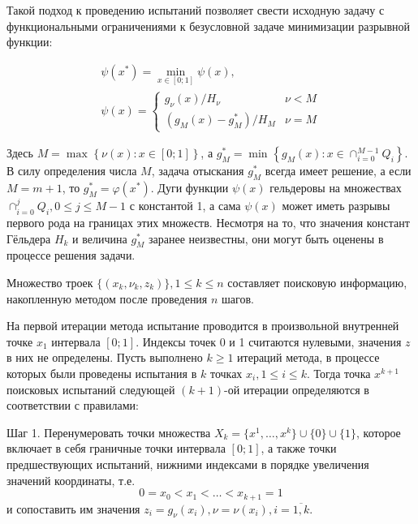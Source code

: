 \documentclass[11pt, oneside, a4paper]{article}
\begin{document}
Такой подход к проведению испытаний позволяет свести исходную задачу с функциональными
ограничениями к безусловной задаче минимизации разрывной функции:

\begin{displaymath}
  \begin{array}{lr}
    \psi (x^{*})=\min_{x\in [0;1]}\psi (x), \\
    \psi (x)={\begin{cases}g_{\nu }(x)/H_{\nu }&\nu <M\\(g_{M}(x)-g_{M}^{*})/H_{M}&\nu =M\end{cases}}
  \end{array}
\end{displaymath}

Здесь \(M=\max_{}^{}\left\{\nu (x):x\in [0;1]\right\}\), а \(g_{M}^{*}=\min _{}^{}\left\{g_{M}(x):x\in \cap _{i=0}^{M-1}Q_{i}\right\}\).
В силу определения числа \(M\), задача отыскания \(g_{M}^{*}\)
всегда имеет решение, а если \(M=m+1\), то \(g_{M}^{*}=\varphi(x^{*})\).
Дуги функции \(\psi (x)\) гельдеровы на множествах \(\cap _{i=0}^{j}Q_{i},0\leq j\leq M-1\)
с константой 1, а сама \(\psi (x)\) может иметь разрывы первого рода на границах этих множеств.
Несмотря на то, что значения констант Гёльдера \(H_k\) и величина \(g_{M}^{*}\) заранее неизвестны,
они могут быть оценены в процессе решения задачи.

Множество троек \(\{(x_k,\nu_k,z_k)\}, 1\leqslant k\leqslant n\) составляет поисковую информацию,
накопленную методом после проведения \(n\) шагов.

На первой итерации метода испытание проводится в произвольной внутренней точке \(x_1\)
интервала \([0;1]\). Индексы точек 0 и 1 считаются нулевыми, значения \(z\) в
них не определены. Пусть выполнено \(k\geqslant 1\) итераций метода,
в процессе которых были проведены испытания в \(k\) точках \(x_i, 1\leqslant i\leqslant k\).
Тогда точка \(x^{k+1}\) поисковых испытаний следующей \((k+1)\)-ой
итерации определяются в соответствии с правилами:

Шаг 1. Перенумеровать точки множества \(X_k=\{x^1,\dotsc,x^k\}\cup\{0\}\cup\{1\}\),
которое включает в себя граничные точки интервала \([0;1]\), а также точки предшествующих
испытаний, нижними индексами в порядке увеличения значений координаты, т.е.
\begin{displaymath}
0=x_0<x_1<\dotsc<x_{k+1}=1
\end{displaymath}
и сопоставить им значения \(z_{i}=g_{\nu }(x_{i}),\nu =\nu (x_{i}),i={\overline {1,k}}\).
\end{document}
